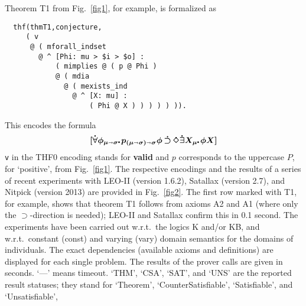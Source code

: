 \documentclass{ecai2014}
\def\lambdot{\rule{0.6mm}{0.6mm}\hspace{0.4ex}}
\newcommand\entity[1]{\text{\textrm{#1}}}
\def\HOL{\entity{HOL}\xspace}
\def\ar{\shortrightarrow}
\newcommand\hol[1]{\boldsymbol{#1}}
\newcommand\llift[1]{\dot{#1}}
\begin{document}
Theorem T1 from Fig.~\ref{fig1}, for example, is formalized as 

{\footnotesize
\begin{verbatim}
  thf(thmT1,conjecture,
     ( v
      @ ( mforall_indset
        @ ^ [Phi: mu > $i > $o] :
            ( mimplies @ ( p @ Phi )
            @ ( mdia
              @ ( mexists_ind
                @ ^ [X: mu] :
                    ( Phi @ X ) ) ) ) ) )).
\end{verbatim}
} 

\noindent This encodes the \HOL formula
$$\hol{[\llift{\forall}\phi_{\mu\ar \sigma} \lambdot}\hol{p_{(\mu\ar
    \sigma)\ar \sigma}\phi\,\llift{\supset}\, \llift{\Diamond}
  \llift{\exists} X_\mu \lambdot \phi X]}$$ \texttt{v} in the THF0
encoding stands for \textbf{valid} and $p$ corresponds to the
uppercase $P$, for `positive', from Fig.~\ref{fig1}.  The
respective encodings and the results of a series of recent experiments with
LEO-II (version 1.6.2), Satallax (version 2.7), and Nitpick (version
2013) are provided in Fig.~\ref{fig2}.  The first row marked with T1,
for example, shows that theorem T1 follows from axioms A2 and A1
(where only the $\supset$-direction is needed); LEO-II and Satallax
confirm this in 0.1 second.  The experiments have been carried
out w.r.t.~the logics K and/or KB, and w.r.t.~constant (const) and
varying (vary) domain semantics for the domains of individuals. The
exact dependencies (available axioms and definitions) are displayed for each
single problem. The results of the prover calls are given in
seconds. `---' means timeout. `THM', `CSA', `SAT', and `UNS'
are the reported result statuses; they stand for `Theorem',
`CounterSatisfiable', `Satisfiable', and `Unsatisfiable',
\end{document}
